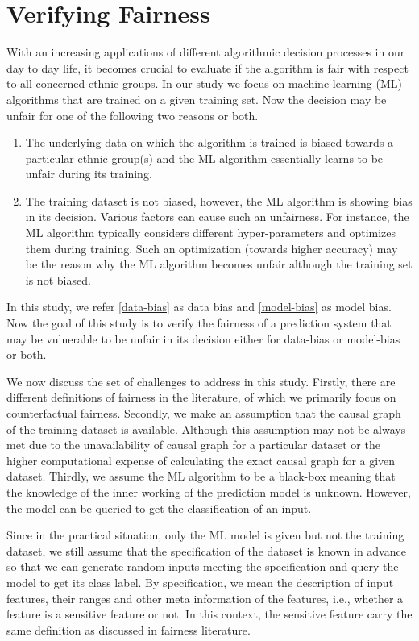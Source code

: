 \clearpage
\section{Verifying Fairness}
With an increasing applications of different algorithmic decision processes in our day to day life, it becomes crucial to evaluate if the algorithm is fair with respect to  all concerned ethnic groups.  In our study we focus on machine learning (ML) algorithms that are trained on a given training set. Now the decision may be unfair for one of the following two reasons or both. 
\begin{enumerate}
	\item \label{data-bias} The underlying data on which the algorithm is trained is biased towards a particular ethnic group(s) and the ML algorithm essentially learns to be unfair during its training. 
	\item \label{model-bias} The training dataset is not biased, however, the ML algorithm is showing bias in its decision. Various factors can cause such an unfairness. For instance, the ML algorithm typically considers different hyper-parameters and optimizes them during training. Such an optimization (towards higher accuracy) may be the reason why the ML algorithm becomes unfair although the training set is not biased. 
\end{enumerate}

In this study, we refer \ref{data-bias} as data bias and \ref{model-bias} as model bias. Now the goal of this study is to verify the fairness of a prediction system that may be vulnerable to be unfair in its decision either for data-bias or model-bias or both.  

We now discuss the set of challenges to address in this study. Firstly, there are different definitions of fairness in the literature, of which we primarily focus on counterfactual fairness.  Secondly,  we make an assumption that the causal graph of the training dataset is available. Although this assumption may not be always met due to the unavailability of causal graph for a particular dataset or the higher computational expense of calculating the exact causal graph for a given dataset.  Thirdly, we assume the ML algorithm to be a black-box meaning that the knowledge of the inner working of the prediction model is unknown. However, the model can be queried to get the classification of an input. 


Since in the practical situation, only the ML model is given but not the training dataset, we still assume that the specification of the dataset is known in advance so that we can generate random inputs meeting the specification and query the model to get its class label. By specification, we mean the description of input features, their ranges and other meta information of the features, i.e., whether a feature is a sensitive feature or not. In this context, the sensitive feature carry the same definition as discussed in fairness literature.  


